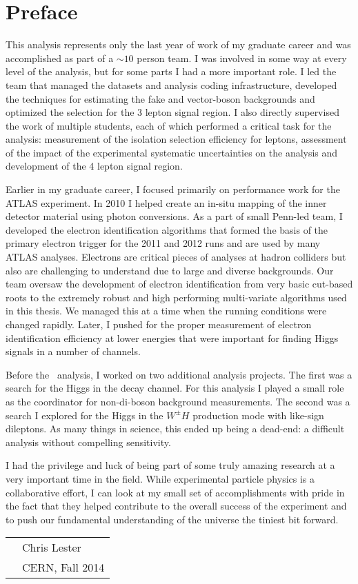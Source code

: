 \chapter*{Preface}

This analysis represents only the last year of work of my graduate career and was accomplished as part of
a $\sim10$ person team. I was involved in some way at every level 
of the analysis, but for some parts I had a more important role.
I led the team that managed the datasets and analysis coding infrastructure, developed the techniques
for estimating the fake and vector-boson backgrounds and optimized
the selection for the 3 lepton signal region. I also directly supervised the work of multiple students, 
each of which performed a critical task for the analysis: measurement of the isolation
selection efficiency for leptons, assessment of the impact of the experimental
systematic uncertainties on the analysis and development of the 4 lepton signal region. 

Earlier in my graduate career, I focused primarily on performance work for the ATLAS experiment.
In 2010 I helped create an in-situ mapping of the inner detector material using photon conversions.  
As a part of small Penn-led team, I developed the electron
identification algorithms that formed the basis of the primary electron trigger for the
2011 and 2012 runs and are used by many ATLAS analyses. Electrons are critical 
pieces of analyses at hadron colliders but also are challenging to understand
due to large and diverse backgrounds. Our team oversaw the development of electron identification
from very basic cut-based roots to the extremely robust and high performing
multi-variate algorithms used in this thesis. We managed this at a time
when the running conditions were changed rapidly. Later, I pushed for the proper
measurement of electron identification efficiency at lower energies that 
were important for finding Higgs signals in a number of channels.

Before the \tth\ analysis, I worked on two additional analysis projects. The first
was a search for the Higgs in the \WW decay channel. For this analysis
I played a small role as the coordinator for non-\WW di-boson background measurements.
The second was a search I explored for the Higgs in the $W^{\pm}H$ production
mode with like-sign dileptons. As many things in science, this ended up
being a dead-end: a difficult analysis without compelling sensitivity. 

I had the privilege and luck of being part of some truly amazing research at a very important
time in the field. While experimental particle physics is a collaborative effort,
I can look at my small set of accomplishments with pride in the fact that they helped 
contribute to the overall success of the experiment and to push our fundamental 
understanding of the universe the tiniest bit forward. 


\vspace{0.05\textheight}

\begin{tabular}{p{} l}
  & Chris Lester            \\
  & CERN, Fall 2014   \\
\end{tabular}


